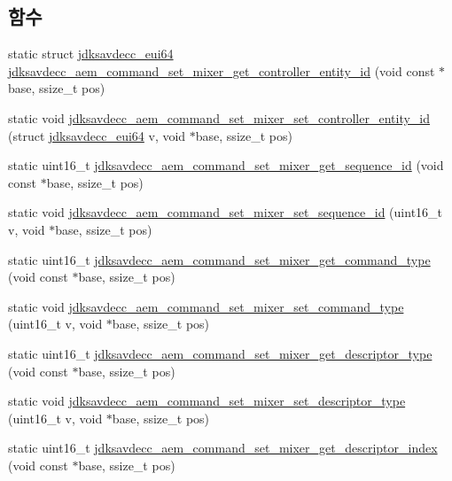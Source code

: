 \subsection*{함수}
\begin{DoxyCompactItemize}
\item 
static struct \hyperlink{structjdksavdecc__eui64}{jdksavdecc\+\_\+eui64} \hyperlink{group__command__set__mixer_ga79464e76f2178a35958092e4d79a9de7}{jdksavdecc\+\_\+aem\+\_\+command\+\_\+set\+\_\+mixer\+\_\+get\+\_\+controller\+\_\+entity\+\_\+id} (void const $\ast$base, ssize\+\_\+t pos)
\item 
static void \hyperlink{group__command__set__mixer_ga63b4b1ac83f0aeb41a08b86ad3e1e216}{jdksavdecc\+\_\+aem\+\_\+command\+\_\+set\+\_\+mixer\+\_\+set\+\_\+controller\+\_\+entity\+\_\+id} (struct \hyperlink{structjdksavdecc__eui64}{jdksavdecc\+\_\+eui64} v, void $\ast$base, ssize\+\_\+t pos)
\item 
static uint16\+\_\+t \hyperlink{group__command__set__mixer_gad7158a4952f4b3c9fc46c65f3170f0cc}{jdksavdecc\+\_\+aem\+\_\+command\+\_\+set\+\_\+mixer\+\_\+get\+\_\+sequence\+\_\+id} (void const $\ast$base, ssize\+\_\+t pos)
\item 
static void \hyperlink{group__command__set__mixer_ga2ad9c10c22ee4a87cee7185302ae53ee}{jdksavdecc\+\_\+aem\+\_\+command\+\_\+set\+\_\+mixer\+\_\+set\+\_\+sequence\+\_\+id} (uint16\+\_\+t v, void $\ast$base, ssize\+\_\+t pos)
\item 
static uint16\+\_\+t \hyperlink{group__command__set__mixer_ga0a7be1c5ff0af54ffd02b752b1a27363}{jdksavdecc\+\_\+aem\+\_\+command\+\_\+set\+\_\+mixer\+\_\+get\+\_\+command\+\_\+type} (void const $\ast$base, ssize\+\_\+t pos)
\item 
static void \hyperlink{group__command__set__mixer_gaf1d3f5b7c339c746d69d2beafa030d90}{jdksavdecc\+\_\+aem\+\_\+command\+\_\+set\+\_\+mixer\+\_\+set\+\_\+command\+\_\+type} (uint16\+\_\+t v, void $\ast$base, ssize\+\_\+t pos)
\item 
static uint16\+\_\+t \hyperlink{group__command__set__mixer_ga3c8af464ce6b0f067aa58b6607e154ce}{jdksavdecc\+\_\+aem\+\_\+command\+\_\+set\+\_\+mixer\+\_\+get\+\_\+descriptor\+\_\+type} (void const $\ast$base, ssize\+\_\+t pos)
\item 
static void \hyperlink{group__command__set__mixer_ga81038e8461d90c066a8668ccaa14d993}{jdksavdecc\+\_\+aem\+\_\+command\+\_\+set\+\_\+mixer\+\_\+set\+\_\+descriptor\+\_\+type} (uint16\+\_\+t v, void $\ast$base, ssize\+\_\+t pos)
\item 
static uint16\+\_\+t \hyperlink{group__command__set__mixer_ga4f7825aeba5cf809dd446b2304e15f31}{jdksavdecc\+\_\+aem\+\_\+command\+\_\+set\+\_\+mixer\+\_\+get\+\_\+descriptor\+\_\+index} (void const $\ast$base, ssize\+\_\+t pos)

\end{DoxyCompactItemize}
